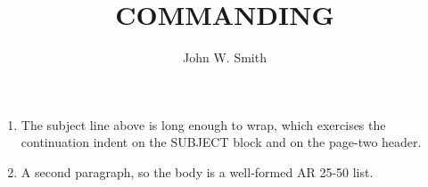 \documentclass{../armymemo}
\author{John W. Smith}\rank{CPT}\branch{CY}
\title{COMMANDING}
\begin{document}
\begin{enumerate}
	\item The subject line above is long enough to wrap, which exercises the
	      continuation indent on the SUBJECT block and on the page-two header.
	\item A second paragraph, so the body is a well-formed AR 25-50 list.
\end{enumerate}
\end{document}
